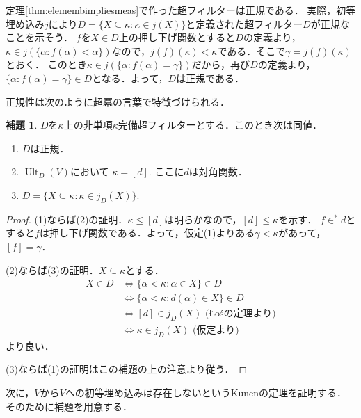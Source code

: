 \documentclass[uplatex]{jsarticle}
\newcommand{\Ult}{\operatorname{Ult}}
\renewcommand\subset{\subseteq}
\theoremstyle{definition}
\newtheorem{lem}[thm]{補題}
\begin{document}
	定理\ref{thm:elemembimpliesmeas}で作った超フィルターは正規である．
	実際，初等埋め込み$j$により$D = \{ X \subset \kappa : \kappa \in j(X) \}$と定義された超フィルター$D$が正規なことを示そう．
	$f$を$X \in D$上の押し下げ関数とすると$D$の定義より，$\kappa \in j(\{ \alpha : f(\alpha) < \alpha \})$なので，$j(f)(\kappa) < \kappa$である．そこで$\gamma = j(f)(\kappa)$とおく．
	このとき$\kappa \in j(\{ \alpha : f(\alpha) = \gamma \})$だから，再び$D$の定義より，$\{ \alpha : f(\alpha) = \gamma \} \in D$となる．よって，$D$は正規である．

	正規性は次のように超冪の言葉で特徴づけられる．

	\begin{lem}
		$D$を$\kappa$上の非単項$\kappa$完備超フィルターとする．このとき次は同値．
		\begin{enumerate}
			\item $D$は正規．
			\item $\Ult_D(V)$において $\kappa = [d]$. ここに$d$は対角関数．
			\item $D = \{ X \subset \kappa : \kappa \in j_D(X) \}$.
		\end{enumerate}
	\end{lem}
	\begin{proof}
		(1)ならば(2)の証明．$\kappa \le [d]$は明らかなので，$[d] \le \kappa$を示す．
		$f \in^* d$とすると$f$は押し下げ関数である．よって，仮定(1)よりある$\gamma < \kappa$があって，$[f] = \gamma$．
		
		(2)ならば(3)の証明．$X \subset \kappa$とする．
		\begin{align*}
			X \in D &\iff \{ \alpha < \kappa : \alpha \in X \} \in D \\
			 &\iff \{ \alpha < \kappa : d(\alpha) \in X \} \in D \\
			 &\iff [d] \in j_D(X) \text{ (Łośの定理より)}\\
			 &\iff \kappa \in j_D(X) \text{ (仮定より)}
		\end{align*}
		より良い．
		
		(3)ならば(1)の証明はこの補題の上の注意より従う．
	\end{proof}

	次に，$V$から$V$への初等埋め込みは存在しないというKunenの定理を証明する．そのために補題を用意する．
	
\end{document}
